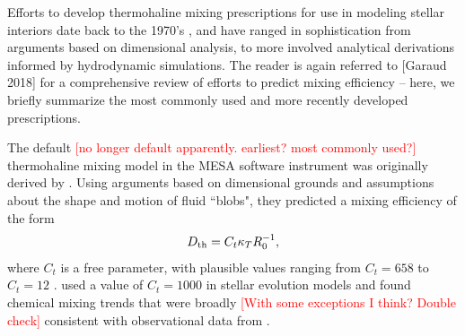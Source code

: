 Efforts to develop thermohaline mixing prescriptions for use in modeling stellar interiors date back to the 1970's \citep{ulrich_1972}, and have ranged in sophistication from arguments based on dimensional analysis, to more involved analytical derivations informed by hydrodynamic simulations. 
The reader is again referred to [Garaud 2018] for a comprehensive review of efforts to predict mixing efficiency -- here, we briefly summarize the most commonly used and more recently developed prescriptions.



The default \textcolor{red}{[no longer default apparently. earliest? most commonly used?]} thermohaline mixing model in the MESA software instrument \citep{mesa2} was originally derived by \citet{ulrich_1972, kippenhahn_etal_1980}.
Using arguments based on dimensional grounds and assumptions about the shape and motion of fluid ``blobs", they predicted a mixing efficiency of the form
\begin{equation} \label{eq:Dth-kipp}
    \Dth = C_t \kappa_T R_0^{-1},
\end{equation}
\citep[see Eq.~(5) of][]{charbonnel_thermohaline_2007}
where $C_t$ is a free parameter, with plausible values ranging from $C_t = 658$ \citep{ulrich_1972} to $C_t = 12$ \citep{kippenhahn_etal_1980}. 
\citet{charbonnel_thermohaline_2007} used a value of $C_t = 1000$ in stellar evolution models and found chemical mixing trends that were broadly \textcolor{red}{[With some exceptions I think? Double check]} consistent with observational data from \citet{Gratton2000}.

